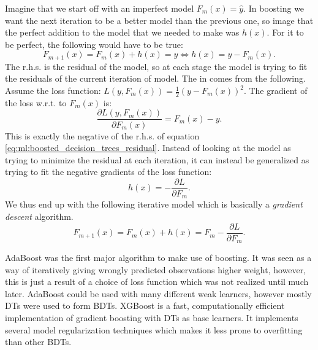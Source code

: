 Imagine that we start off with an imperfect model $F_m(x)=\hat{y}$. In boosting we want the next iteration to be a better model than the previous one, so image that the perfect addition to the model that we needed to make was $h(x)$. For it to be perfect, the following would have to be true:
\begin{equation}
  \label{eq:ml:boosted_decision_trees_residual}
  F_{m+1}(x) = F_m(x) + h(x) = y \Leftrightarrow h(x) = y - F_m(x).
\end{equation}
The r.h.s. is the residual of the model, so at each stage the model is trying to fit the residuals of the current iteration of model. The  in  comes from the following. Assume the loss function: $L(y, F_m(x)) = \frac{1}{2}  (y-F_m(x))^2$. The gradient of the loss w.r.t. to $F_m(x)$ is:
\begin{equation}
  \frac{\partial L(y, F_m(x))}{\partial F_m(x)} = F_m(x) - y. 
\end{equation}
This is exactly the negative of the r.h.s. of equation \eqref{eq:ml:boosted_decision_trees_residual}. Instead of looking at the model as trying to minimize the residual at each iteration, it can instead be generalized as trying to fit the negative gradients of the loss function:
\begin{equation}
  h(x) = - \frac{\partial L}{\partial F_m}.
\end{equation}
We thus end up with the following iterative model which is basically a \emph{gradient descent} algorithm.
\begin{equation}
  F_{m+1}(x) = F_m(x) + h(x) = F_m - \frac{\partial L}{\partial F_m}.
\end{equation}


AdaBoost \autocite{freundDesiciontheoreticGeneralizationOnline1995} was the first major algorithm to make use of boosting. It was seen as a way of iteratively giving wrongly predicted observations higher weight, however, this is just a result of a  choice of loss function which was not realized until much later. AdaBoost could be used with many different weak learners, however mostly DTs were used to form BDTs. XGBoost \autocite{chenXGBoostScalableTree2016} is a fast, computationally efficient implementation of gradient boosting with DTs as base learners. It implements several model regularization techniques which makes it less prone to overfitting than other BDTs. 

